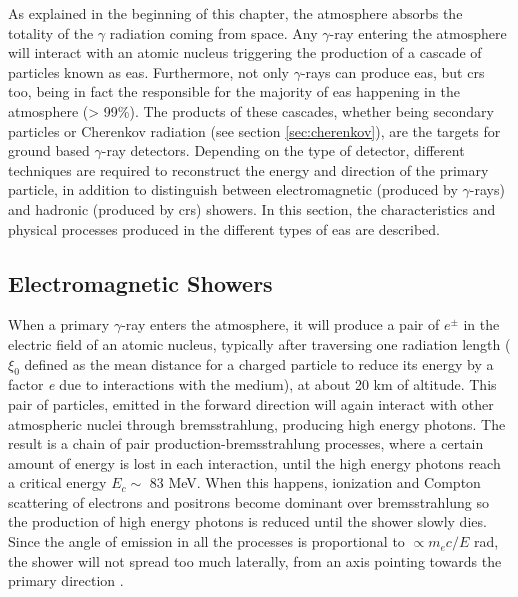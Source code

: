 \documentclass[main.tex]{subfiles}
\begin{document}
As explained in the beginning of this chapter, the atmosphere absorbs the totality of the $\gamma$ radiation coming from space. Any $\gamma$-ray entering the atmosphere will interact with an atomic nucleus triggering the production of a cascade of particles known as \gls{eas}. Furthermore, not only $\gamma$-rays can produce \gls{eas}, but \glspl{cr} too,  being in fact the responsible for the majority of \gls{eas} happening in the atmosphere (> 99\%). The products of these cascades, whether being secondary particles or Cherenkov radiation (see section \ref{sec:cherenkov}), are the targets for ground based $\gamma$-ray detectors. Depending on the type of detector, different techniques are required to reconstruct the energy and direction of the primary particle, in addition to distinguish between electromagnetic (produced by $\gamma$-rays) and hadronic (produced by \glspl{cr}) showers. In this section, the characteristics and physical processes produced in the different types of \gls{eas} are described.

\subsection{Electromagnetic Showers}

When a primary $\gamma$-ray enters the atmosphere, it will produce a pair of $e^{\pm}$ in the electric field of an atomic nucleus, typically after traversing one radiation length ($\xi_{0}$ defined as the mean distance for a charged particle to reduce its energy by a factor \textit{e} due to interactions with the medium), at about 20 km of altitude. This pair of particles, emitted in the forward direction will again interact with other atmospheric nuclei through bremsstrahlung, producing high energy photons. The result is a chain of pair production-bremsstrahlung processes, where a certain amount of energy is lost in each interaction, until the high energy photons reach a critical energy $E_{c} \sim$ 83 MeV. When this happens, ionization and Compton scattering of electrons and positrons become dominant over bremsstrahlung so the production of high energy photons is reduced until the shower slowly dies. Since the angle of emission in all the processes is proportional to $\propto m_e c / E$ rad, the shower will not spread too much laterally, from an axis pointing towards the primary direction \cite{weekes2003HEAstrophy}. \\
\end{document}
